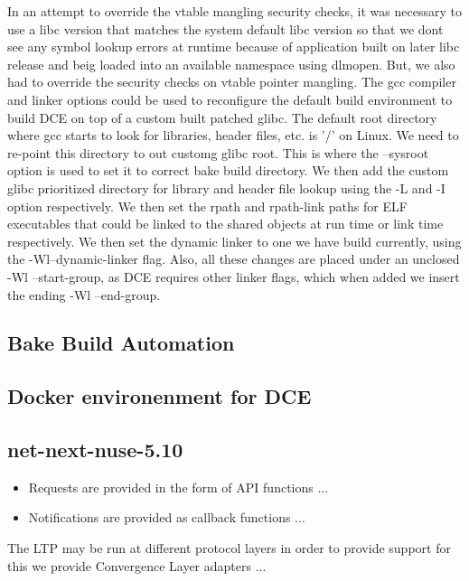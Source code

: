 \documentclass{sig-alternate}
\begin{document}
In an attempt to override the vtable mangling security checks, it was necessary to use a libc version that matches the system default libc version 
so that we dont see any symbol lookup errors at runtime because of application built on later libc release and beig loaded into an available namespace
using dlmopen. But, we also had to override the security checks on vtable pointer mangling. The gcc compiler and linker options could be used to 
reconfigure the default build environment to build DCE on top of a custom built patched glibc. The default root directory where gcc starts to look for
libraries, header files, etc. is  '/' on Linux. We need to re-point this directory to out customg glibc root. This is where the --sysroot option 
is used to set it to correct bake build directory. We then add the custom glibc prioritized directory for library and header file lookup using the 
-L and -I option respectively. We then set the rpath and rpath-link paths for ELF executables that could be linked to the shared objects at run time 
or link time respectively. We then set the dynamic linker to one we have build currently, using the -Wl--dynamic-linker flag. Also, all these changes
are placed under an unclosed -Wl --start-group, as DCE requires other linker flags, which when added we insert the ending -Wl --end-group.



\subsection{Bake Build Automation}

\subsection{Docker environenment for DCE}

\subsection{net-next-nuse-5.10}


\begin{itemize}
 \item Requests are provided in the form of API functions ...
 \item Notifications are provided as callback functions ...
\end{itemize}

The LTP may be run at different protocol layers in order to provide support for this
we provide Convergence Layer adapters ...
\end{document}

